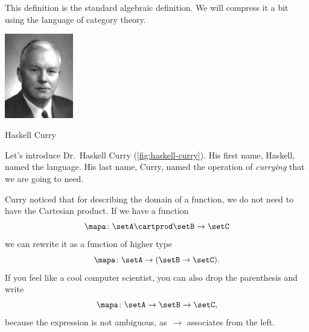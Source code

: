 This definition is the standard algebraic definition.
We will compress it a bit using the language of category theory.

\begin{marginfigure}
    \includegraphics[width=3cm]{../../../pics/haskell.jpg}
    \caption{Haskell Curry}
    \label{fig:haskell-curry}
\end{marginfigure}

Let's introduce Dr.~Haskell Curry (\cref{fig:haskell-curry}).
His first name,  Haskell, named the language.
His last name, Curry, named the operation of \emph{currying} that we are going to need.

Curry noticed that for describing the domain of a function, we do not need to have the Cartesian product.
If we have a function
\begin{equation}
    \label{eq:currying-1}
    \mapa \colon \setA \cartprod \setB \to \setC
\end{equation}
we can rewrite it as a function of higher type
\begin{equation}
    \label{eq:currying-2}
    \mapa \colon \setA \to ( \setB \to \setC).
\end{equation}
If you feel like a cool computer scientist, you can also drop the parenthesis and write
\begin{equation}
    \label{eq:currying-3}
    \mapa \colon \setA \to \setB \to \setC,
\end{equation}
because the expression is not ambiguous, as~$\to$ associates from the left.




